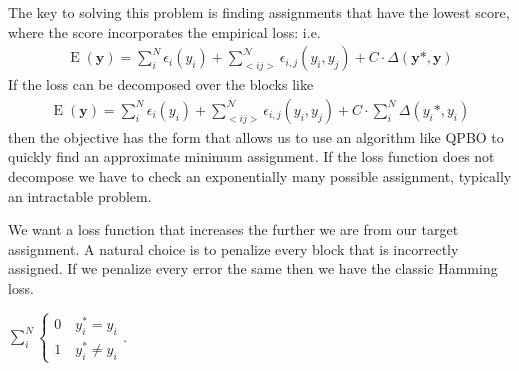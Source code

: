 The key to solving this problem is finding assignments that have the
lowest score, where the score incorporates the empirical loss: i.e.
%
\begin{align}
\operatorname{E}(\mathbf{y}) = \sum_i^N\epsilon_i(y_i) + \sum_{<i
  j>}^{\mathcal{N}}\epsilon_{i,j}(y_i,y_j) + C\cdot\Delta(\mathbf{y}*, \mathbf{y})
\end{align}
%
If the loss can be decomposed over the blocks like
%
\begin{align}
\operatorname{E}(\mathbf{y}) = \sum_i^N\epsilon_i(y_i) + \sum_{<i
  j>}^{\mathcal{N}}\epsilon_{i,j}(y_i,y_j) + C\cdot\sum_i^N\Delta(y_i*, y_i)
\end{align}
%
then the objective has the form that allows us to use an algorithm
like QPBO to quickly find an approximate minimum assignment. If the
loss function does not decompose we have to check an exponentially
many possible assignment, typically an intractable problem.

We want a loss function that increases the further we are from our
target assignment. A natural choice is to penalize every block that is
incorrectly assigned. If we penalize every error the same then we have
the classic Hamming loss. 

$\sum_i^N\begin{cases}
  0 \quad y_i^* = y_i \\
  1 \quad y_i^* \neq y_i
\end{cases}$. 

